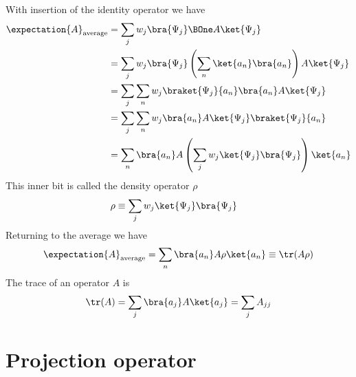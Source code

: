 With insertion of the identity operator we have
%
\begin{equation}\label{eqn:lecture8makingSenseOfQM:1100}
\begin{aligned}
\expectation{A}_{\text{average}}
&= \sum_j w_j \bra{\Psi_j} \BOne A \ket{\Psi_j} \\
&= \sum_j w_j \bra{\Psi_j} \left( \sum_n \ket{a_n} \bra{a_n} \right) A \ket{\Psi_j} \\
&= \sum_j \sum_n w_j \braket{\Psi_j}{a_n} \bra{a_n} A \ket{\Psi_j} \\
&= \sum_j \sum_n w_j \bra{a_n} A \ket{\Psi_j} \braket{\Psi_j}{a_n}  \\
&= \sum_n \bra{a_n} A \left( \sum_j w_j \ket{\Psi_j} \bra{\Psi_j} \right) \ket{a_n}  \\
\end{aligned}
\end{equation}
%
This inner bit is called the density operator \(\rho\)
%
\begin{equation}\label{eqn:PHY356HNov2:40}
\begin{aligned}
\rho &\equiv \sum_j w_j \ket{\Psi_j} \bra{\Psi_j}
\end{aligned}
\end{equation}
%
Returning to the average we have
%
\begin{equation}\label{eqn:PHY356HNov2:50}
\begin{aligned}
\expectation{A}_{\text{average}} = \sum_n \bra{a_n} A \rho \ket{a_n} \equiv \tr(A \rho)
\end{aligned}
\end{equation}
%
The trace of an operator \(A\) is
%
\begin{equation}\label{eqn:PHY356HNov2:60}
\begin{aligned}
\tr(A) = \sum_j \bra{a_j} A \ket{a_j} = \sum_j A_{jj}
\end{aligned}
\end{equation}
%
\section{Projection operator}


